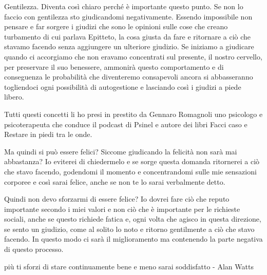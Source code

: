 \documentclass[12pt]{book} %
\begin{document}
Gentilezza. Diventa così chiaro perché è importante questo punto. Se non lo faccio con gentilezza sto giudicandomi
negativamente. Essendo impossibile non pensare e far sorgere i giudizi che sono le opinioni sulle cose che creano
turbamento di cui parlava Epitteto, la cosa giusta da fare e ritornare a ciò che stavamo facendo senza aggiungere un
ulteriore giudizio. Se iniziamo a giudicare quando ci accorgiamo che non eravamo concentrati sul presente, il nostro
cervello, per preservare il suo benessere, ammonirà questo comportamento e di conseguenza le probabilità che
diventeremo consapevoli ancora si abbasseranno togliendoci ogni possibilità di autogestione e lasciando così i giudizi
a piede libero. 

Tutti questi concetti li ho presi in prestito da Gennaro Romagnoli uno psicologo e psicoterapeuta che conduce il podcast
di Psinel e autore dei libri Facci caso e Restare in piedi tra le onde.

Ma quindi si può essere felici? Siccome giudicando la felicità non sarà mai abbastanza? Io eviterei di chiedermelo e se
sorge questa domanda ritornerei a ciò che stavo facendo, godendomi il momento e concentrandomi sulle mie sensazioni
corporee e così sarai felice, anche se non te lo sarai verbalmente detto. 

Quindi non devo sforzarmi di essere felice? Io dovrei fare ciò che reputo importante secondo i miei valori e non ciò che
è importante per le richieste sociali, anche se questo richiede fatica e, ogni volta che agisco in questa direzione, se
sento un giudizio, come al solito lo noto e ritorno gentilmente a ciò che stavo facendo. In questo modo ci sarà il
miglioramento ma contenendo la parte negativa di questo processo. 

più ti sforzi di stare continuamente bene e meno sarai soddisfatto - Alan Watts


\bigskip


\bigskip


\bigskip


\bigskip


\bigskip


\bigskip


\bigskip
\end{document}
